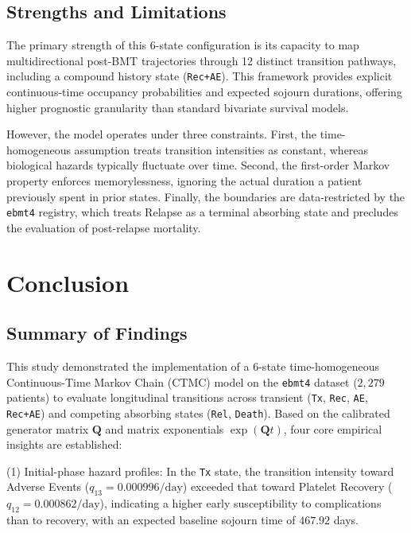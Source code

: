 \documentclass[9pt,a4paper,twocolumn,twoside]{rho-class/rho}
\begin{document}
    \subsection{Strengths and Limitations}
      The primary strength of this 6-state configuration is its capacity to map multidirectional post-BMT trajectories through 12 distinct transition pathways, including a compound history state (\texttt{Rec+AE}). This framework provides explicit continuous-time occupancy probabilities and expected sojourn durations, offering higher prognostic granularity than standard bivariate survival models.

      However, the model operates under three constraints. First, the time-homogeneous assumption treats transition intensities as constant, whereas biological hazards typically fluctuate over time. Second, the first-order Markov property enforces memorylessness, ignoring the actual duration a patient previously spent in prior states. Finally, the boundaries are data-restricted by the \texttt{ebmt4} registry, which treats Relapse as a terminal absorbing state and precludes the evaluation of post-relapse mortality.

\section{Conclusion}
    
    \subsection{Summary of Findings}
        This study demonstrated the implementation of a 6-state time-homogeneous Continuous-Time Markov Chain (CTMC) model on the \texttt{ebmt4} dataset ($2,279$ patients) to evaluate longitudinal transitions across transient (\texttt{Tx}, \texttt{Rec}, \texttt{AE}, \texttt{Rec+AE}) and competing absorbing states (\texttt{Rel}, \texttt{Death}). Based on the calibrated generator matrix $\mathbf{Q}$ and matrix exponentials $\exp(\mathbf{Q}t)$, four core empirical insights are established:

        \noindent (1) Initial-phase hazard profiles: In the \texttt{Tx} state, the transition intensity toward Adverse Events ($q_{13} = 0.000996/\text{day}$) exceeded that toward Platelet Recovery ($q_{12} = 0.000862/\text{day}$), indicating a higher early susceptibility to complications than to recovery, with an expected baseline sojourn time of $467.92$ days. 
\end{document}
